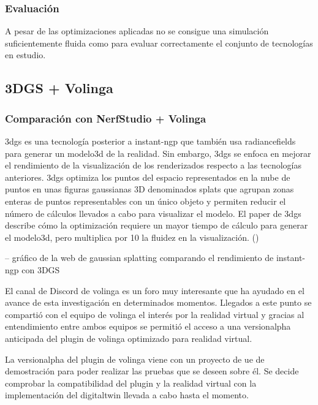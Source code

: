 \documentclass[a4paper, 12pt, spanish, twoside]{article}
\begin{document}
\subsubsection{Evaluación} \label{sec:implementacion:nerfstudio-volinga:evaluacion}

A pesar de las optimizaciones aplicadas no se consigue una simulación suficientemente fluida como para evaluar correctamente el conjunto de tecnologías en estudio. 

\subsection{3DGS + Volinga} \label{sec:implementacion:3dgs-volinga}

\subsubsection{Comparación con NerfStudio + Volinga} \label{sec:implementacion:3dgs-volinga:comparacion}

\acrfull{3dgs} es una tecnología posterior a \gls{instant-ngp} que también usa \glspl{radiancefield} para generar un \gls{modelo3d} de la realidad. Sin embargo, \acrshort{3dgs} se enfoca en mejorar el rendimiento de la visualización de los renderizados respecto a las tecnologías anteriores. \acrshort{3dgs} optimiza los puntos del espacio representados en la nube de puntos en unas figuras gaussianas 3D denominados \glspl{splat} que agrupan zonas enteras de puntos representables con un único objeto y permiten reducir el número de cálculos llevados a cabo para visualizar el modelo. El paper de \acrshort{3dgs} describe cómo la optimización requiere un mayor tiempo de cálculo para generar el \gls{modelo3d}, pero multiplica por 10 la fluidez en la visualización. (\cite{kerbl3Dgaussians}) 

-- gráfico de la web de gaussian splatting comparando el rendimiento de instant-ngp con 3DGS 

El canal de Discord de \gls{volinga} es un foro muy interesante que ha ayudado en el avance de esta investigación en determinados momentos. Llegados a este punto se compartió con el equipo de \gls{volinga} el interés por la realidad virtual y gracias al entendimiento entre ambos equipos se permitió el acceso a una \gls{versionalpha} anticipada del \gls{plugin} de \gls{volinga} optimizado para realidad virtual. 

La \gls{versionalpha} del \gls{plugin} de \gls{volinga} viene con un proyecto de \acrshort{ue} de demostración para poder realizar las pruebas que se deseen sobre él. Se decide comprobar la compatibilidad del \gls{plugin} y la realidad virtual con la implementación del \gls{digitaltwin} llevada a cabo hasta el momento. 
\end{document}
